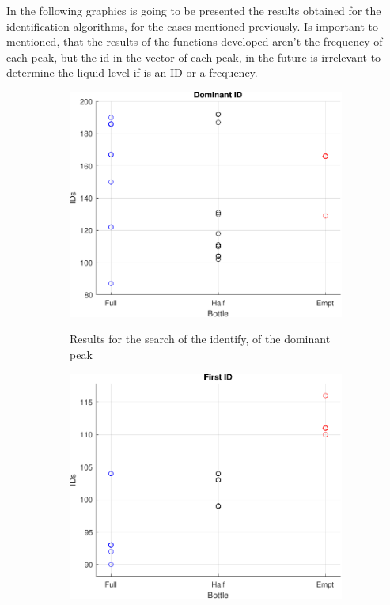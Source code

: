 In the following graphics is going to be presented the results obtained for the identification algorithms, for the cases mentioned previously. Is important to mentioned, that the results of the functions developed aren't the frequency of each peak, but the id in the vector of each peak, in the future is irrelevant to determine the liquid level if is an ID or a frequency.
\begin{figure}[]
    \centering
    \begin{subfigure}{0.45\textwidth}
        \centering
        \includegraphics[width=\linewidth]{Chapters/6CHP/Figures/ResultsuCGraphs/MIC/BotMiddomID.pdf}
        \caption{Results for the search of the identify, of the dominant peak}{}
        \label{subfig:domIDMIC}
    \end{subfigure}
    \begin{subfigure}{0.45\textwidth}
        \centering
        \includegraphics[width=\linewidth]{Chapters/6CHP/Figures/ResultsuCGraphs/MIC/BotMidfID.pdf}

\end{subfigure}
\end{figure}
